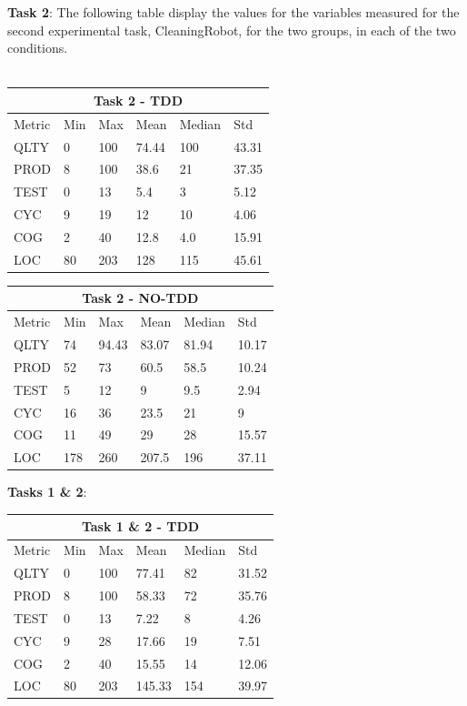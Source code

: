 \noindent\textbf{Task 2}: The following table display the values for the variables measured for the second experimental task, CleaningRobot, for the two groups, in each of the two conditions.
\\ \  \\
\noindent
\begin{tabular}{ |p{2cm}||p{1.6cm}|p{1.6cm}|p{1.6cm}|p{1.6cm}|p{1.6cm}|}
    \hline
        \multicolumn{6}{|c|}{Task 2 - TDD} \\
    \hline
        Metric & Min & Max & Mean & Median & Std\\
    \hline
        QLTY & 0 & 100 & 74.44 & 100 & 43.31 \\
        PROD & 8 & 100 & 38.6 & 21 & 37.35 \\
        TEST & 0 & 13 & 5.4 & 3 & 5.12 \\
        CYC & 9 & 19 & 12 & 10 & 4.06 \\
        COG & 2 & 40 & 12.8 & 4.0 & 15.91 \\
        LOC & 80 & 203 & 128 & 115 & 45.61 \\
    \hline
\end{tabular}


\noindent
\begin{tabular}{ |p{2cm}||p{1.6cm}|p{1.6cm}|p{1.6cm}|p{1.6cm}|p{1.6cm}|}
    \hline
        \multicolumn{6}{|c|}{Task 2 - NO-TDD} \\
    \hline
        Metric & Min & Max & Mean & Median & Std\\
    \hline
        QLTY & 74 & 94.43 & 83.07 & 81.94 & 10.17 \\
        PROD & 52 & 73 & 60.5 & 58.5 & 10.24 \\
        TEST & 5 & 12 & 9 & 9.5 & 2.94 \\
        CYC & 16 & 36 & 23.5 & 21 & 9 \\
        COG & 11 & 49 & 29 & 28 & 15.57 \\
        LOC & 178 & 260 & 207.5 & 196 & 37.11 \\
    \hline
\end{tabular}

\textbf{Tasks 1 \& 2}:

\noindent
\begin{tabular}{ |p{2cm}||p{1.6cm}|p{1.6cm}|p{1.6cm}|p{1.6cm}|p{1.6cm}|}
    \hline
        \multicolumn{6}{|c|}{Task 1 \& 2 - TDD} \\
    \hline
        Metric & Min & Max & Mean & Median & Std\\
    \hline
        QLTY & 0 & 100 & 77.41 & 82 & 31.52 \\
        PROD & 8 & 100 & 58.33 & 72 & 35.76 \\
        TEST & 0 & 13 & 7.22 & 8 & 4.26 \\
        CYC & 9 & 28 & 17.66 & 19 & 7.51 \\
        COG & 2 & 40 & 15.55 & 14 & 12.06 \\
        LOC & 80 & 203 & 145.33 & 154 & 39.97 \\
    \hline
\end{tabular}

